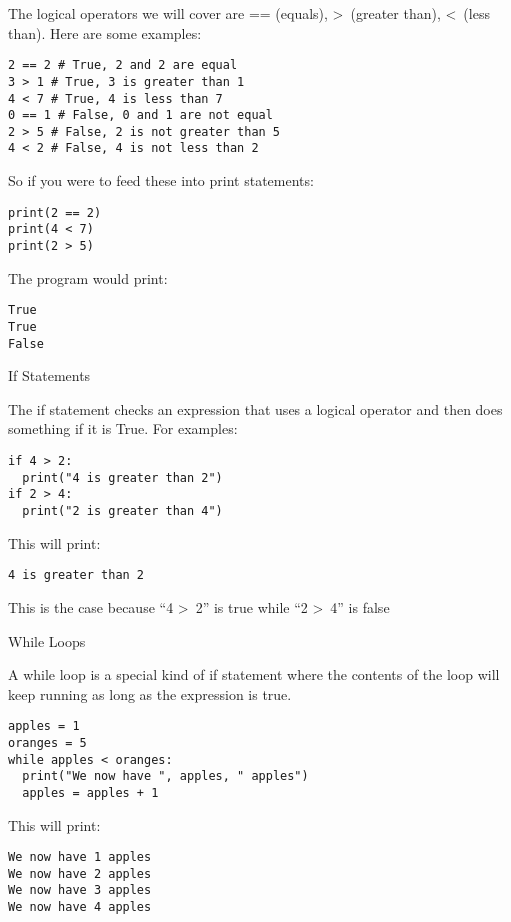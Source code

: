 \documentclass[12pt,oneside]{article}
\newcommand{\q}[1]{``#1''}
\newcommand{\subsectitle}[1]{
  \begin{flushleft}{\large#1}\end{flushleft}
}
\begin{document}
The logical operators we will cover are == (equals), \textgreater~(greater than), \textless~(less than). Here are some examples:

\begin{lstlisting}
2 == 2 # True, 2 and 2 are equal
3 > 1 # True, 3 is greater than 1
4 < 7 # True, 4 is less than 7
0 == 1 # False, 0 and 1 are not equal
2 > 5 # False, 2 is not greater than 5
4 < 2 # False, 4 is not less than 2
\end{lstlisting}

So if you were to feed these into print statements:

\begin{lstlisting}
print(2 == 2)
print(4 < 7)
print(2 > 5)
\end{lstlisting}

The program would print:

\begin{lstlisting}
True
True
False
\end{lstlisting}


\subsectitle{If Statements}

The if statement checks an expression that uses a logical operator and then does something if it is True. For examples:

\begin{lstlisting}
if 4 > 2:
  print("4 is greater than 2")
if 2 > 4:
  print("2 is greater than 4")
\end{lstlisting}

This will print:

\begin{lstlisting}
4 is greater than 2
\end{lstlisting}

This is the case because \q{4 \textgreater~2} is true while \q{2 \textgreater~4} is false

\subsectitle{While Loops}

A while loop is a special kind of if statement where the contents of the loop will keep running as long as the expression is true.

\begin{lstlisting}
apples = 1
oranges = 5
while apples < oranges:
  print("We now have ", apples, " apples")
  apples = apples + 1
\end{lstlisting}

This will print:

\begin{lstlisting}
We now have 1 apples
We now have 2 apples
We now have 3 apples
We now have 4 apples
\end{lstlisting}
\end{document}
